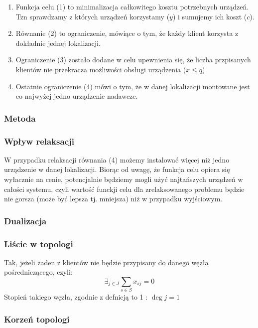 \documentclass{article}
\begin{document}
\begin{enumerate}
  \item Funkcja celu (1) to minimalizacja całkowitego kosztu potrzebnych urządzeń. Tzn sprawdzamy z których urządzeń korzystamy ($y$) i sumujemy ich koszt ($c$).
  \item Równanie (2) to ograniczenie, mówiące o tym, że każdy klient korzysta z dokładnie jednej lokalizacji.
  \item Ograniczenie (3) zostało dodane w celu upewnienia się, że liczba przpisanych klientów nie przekracza możliwości obsługi urządzenia ($x \leq q$)
  \item Ostatnie ograniczenie (4) mówi o tym, że w danej lokalizacji montowane jest co najwyżej jedno urządzenie nadawcze.
\end{enumerate}

\subsubsection{Metoda}

\subsubsection{Wpływ relaksacji}
W przypadku relaksacji równania (4) możemy instalować więcej niż jedno urządzenie w danej lokalizacji. Biorąc od uwagę, że funkcja celu
opiera się wyłacznie na cenie, potencjalnie będziemy mogli użyć najtańszych urządzeń w całości systemu, czyli wartość funckji celu dla zrelaksowanego
problemu będzie nie gorsza (może być lepsza tj. mniejsza) niż w przypadku wyjściowym.

\subsubsection{Dualizacja}


\subsubsection{Liście w topologi}
 Tak, jeżeli żaden z klientów nie będzie przypisany do danego węzła pośredniczącego, czyli:
 \begin{equation}
   \exists_{j \in J} \sum_{s \in S} x_{sj} = 0
 \end{equation}
 Stopień takiego węzła, zgodnie z defnicją to 1 : $\deg j = 1$

\subsubsection{Korzeń topologi}
\end{document}
